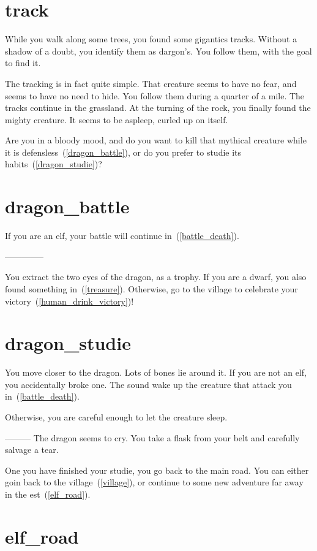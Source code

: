 \section{track}

While you walk along some trees, you found some gigantics tracks. Without a
shadow of a doubt, you identify them as dargon's. You follow them, with
the goal to find it.

The tracking is in fact quite simple. That creature seems to have no fear, and
seems to have no need to hide. You follow them during a quarter of a mile. The
tracks continue in the grassland. At the turning of the rock, you finally found
the mighty creature. It seems to be aspleep, curled up on itself.

Are you in a bloody mood, and do you want to kill that mythical creature while it
is defensless~(\ref{dragon_battle}), or do you prefer to studie its
habits~(\ref{dragon_studie})?

\section{dragon_battle}

If you are an elf, your battle will continue in~(\ref{battle_death}).

--------------


You extract the two eyes of the dragon, as a trophy. If you are a dwarf, you
also found something in~(\ref{treasure}). Otherwise, go to the village to
celebrate your victory~(\ref{human_drink_victory})!

\section{dragon_studie}

You move closer to the dragon. Lots of bones lie around it. If you are not an
elf, you accidentally broke one. The sound wake up the creature that attack you
in~(\ref{battle_death}).

Otherwise, you are careful enough to let the creature sleep.

---------
The dragon seems to cry. You take a flask from your belt and carefully salvage a
tear.

One you have finished your studie, you go back to the main road. You can either
goin back to the village~(\ref{village}), or continue to some new adventure far
away in the est~(\ref{elf_road}).

\section{elf_road}

